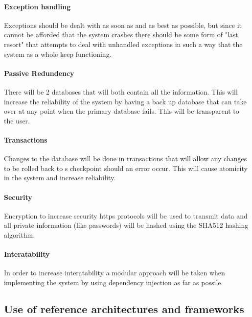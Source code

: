 \documentclass[english]{article}
\begin{document}
			\paragraph{Exception handling}\indent
			Exceptions should be dealt with as soon as and as best as possible, but since it cannot be afforded that the system crashes there should be some form of "last resort" that attempts to deal with unhandled exceptions in such a way that the system as a whole keep functioning.
			
			\paragraph{Passive Redundency}\indent
			There will be 2 databases that will both contain all the information. This will increase the reliability of the system by having a back up database that can take over at any point when the primary database fails. This will be transparent to the user.
			
			\paragraph{Transactions}\indent
			Changes to the database will be done in transactions that will allow any changes to be rolled back to s checkpoint should an error occur. This will cause atomicity in the system and increase reliability.
			
			\paragraph{Security}\indent
			Encryption to increase security https protocols will be used to transmit data and all private information (like passwords) will be hashed using the SHA512 hashing algorithm.
			
			\paragraph{Interatability}\indent
			In order to increase interatability a modular approach will be taken when implementing the system by using dependency injection as far as possile.
			
		\subsection{Use of reference architectures and frameworks}
\end{document}
